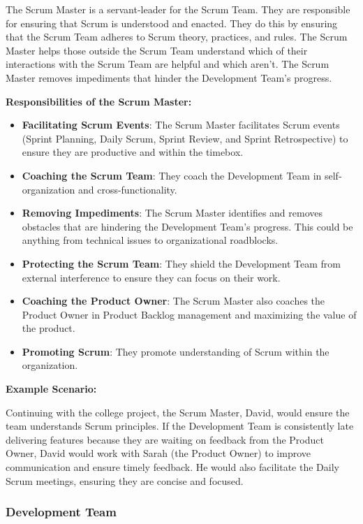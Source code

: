 The Scrum Master is a servant-leader for the Scrum Team. They are responsible
for ensuring that Scrum is understood and enacted. They do this by ensuring
that the Scrum Team adheres to Scrum theory, practices, and rules. The Scrum
Master helps those outside the Scrum Team understand which of their
interactions with the Scrum Team are helpful and which aren't. The Scrum Master
removes impediments that hinder the Development Team's progress.

\textbf{Responsibilities of the Scrum Master:}

\begin{itemize}
  \item \textbf{Facilitating Scrum Events}: The Scrum Master facilitates Scrum events (Sprint Planning, Daily Scrum, Sprint Review, and Sprint Retrospective) to ensure they are productive and within the timebox.
  \item \textbf{Coaching the Scrum Team}: They coach the Development Team in self-organization and cross-functionality.
  \item \textbf{Removing Impediments}: The Scrum Master identifies and removes obstacles that are hindering the Development Team's progress. This could be anything from technical issues to organizational roadblocks.
  \item \textbf{Protecting the Scrum Team}: They shield the Development Team from external interference to ensure they can focus on their work.
  \item \textbf{Coaching the Product Owner}: The Scrum Master also coaches the Product Owner in Product Backlog management and maximizing the value of the product.
  \item \textbf{Promoting Scrum}: They promote understanding of Scrum within the organization.
\end{itemize}

\textbf{Example Scenario:}

Continuing with the college project, the Scrum Master, David, would ensure the
team understands Scrum principles. If the Development Team is consistently late
delivering features because they are waiting on feedback from the Product
Owner, David would work with Sarah (the Product Owner) to improve communication
and ensure timely feedback. He would also facilitate the Daily Scrum meetings,
ensuring they are concise and focused.

\subsubsection{Development Team}

